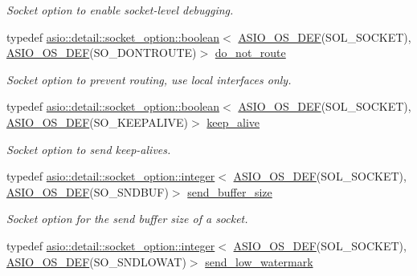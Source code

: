 \begin{DoxyCompactItemize}
\begin{DoxyCompactList}\small\item\em Socket option to enable socket-\/level debugging. \end{DoxyCompactList}\item 
typedef \hyperlink{classasio_1_1detail_1_1socket__option_1_1boolean}{asio\+::detail\+::socket\+\_\+option\+::boolean}$<$ \hyperlink{socket__types_8hpp_a26e0208fa086ac48cf5af1b2a521c74a}{A\+S\+I\+O\+\_\+\+O\+S\+\_\+\+D\+E\+F}(S\+O\+L\+\_\+\+S\+O\+C\+K\+E\+T), \hyperlink{socket__types_8hpp_a26e0208fa086ac48cf5af1b2a521c74a}{A\+S\+I\+O\+\_\+\+O\+S\+\_\+\+D\+E\+F}(S\+O\+\_\+\+D\+O\+N\+T\+R\+O\+U\+T\+E)$>$ \hyperlink{classasio_1_1socket__base_ab7b1853c3ab069c31202a5ea11deb882}{do\+\_\+not\+\_\+route}
\begin{DoxyCompactList}\small\item\em Socket option to prevent routing, use local interfaces only. \end{DoxyCompactList}\item 
typedef \hyperlink{classasio_1_1detail_1_1socket__option_1_1boolean}{asio\+::detail\+::socket\+\_\+option\+::boolean}$<$ \hyperlink{socket__types_8hpp_a26e0208fa086ac48cf5af1b2a521c74a}{A\+S\+I\+O\+\_\+\+O\+S\+\_\+\+D\+E\+F}(S\+O\+L\+\_\+\+S\+O\+C\+K\+E\+T), \hyperlink{socket__types_8hpp_a26e0208fa086ac48cf5af1b2a521c74a}{A\+S\+I\+O\+\_\+\+O\+S\+\_\+\+D\+E\+F}(S\+O\+\_\+\+K\+E\+E\+P\+A\+L\+I\+V\+E)$>$ \hyperlink{classasio_1_1socket__base_a18672db1f78d0e0e58899e90100bf688}{keep\+\_\+alive}
\begin{DoxyCompactList}\small\item\em Socket option to send keep-\/alives. \end{DoxyCompactList}\item 
typedef \hyperlink{classasio_1_1detail_1_1socket__option_1_1integer}{asio\+::detail\+::socket\+\_\+option\+::integer}$<$ \hyperlink{socket__types_8hpp_a26e0208fa086ac48cf5af1b2a521c74a}{A\+S\+I\+O\+\_\+\+O\+S\+\_\+\+D\+E\+F}(S\+O\+L\+\_\+\+S\+O\+C\+K\+E\+T), \hyperlink{socket__types_8hpp_a26e0208fa086ac48cf5af1b2a521c74a}{A\+S\+I\+O\+\_\+\+O\+S\+\_\+\+D\+E\+F}(S\+O\+\_\+\+S\+N\+D\+B\+U\+F)$>$ \hyperlink{classasio_1_1socket__base_a0d4a964ee76ec66ae251e903bff872e5}{send\+\_\+buffer\+\_\+size}
\begin{DoxyCompactList}\small\item\em Socket option for the send buffer size of a socket. \end{DoxyCompactList}\item 
typedef \hyperlink{classasio_1_1detail_1_1socket__option_1_1integer}{asio\+::detail\+::socket\+\_\+option\+::integer}$<$ \hyperlink{socket__types_8hpp_a26e0208fa086ac48cf5af1b2a521c74a}{A\+S\+I\+O\+\_\+\+O\+S\+\_\+\+D\+E\+F}(S\+O\+L\+\_\+\+S\+O\+C\+K\+E\+T), \hyperlink{socket__types_8hpp_a26e0208fa086ac48cf5af1b2a521c74a}{A\+S\+I\+O\+\_\+\+O\+S\+\_\+\+D\+E\+F}(S\+O\+\_\+\+S\+N\+D\+L\+O\+W\+A\+T)$>$ \hyperlink{classasio_1_1socket__base_ac6dce7c293671df85757eeed300d4209}{send\+\_\+low\+\_\+watermark}

\end{DoxyCompactItemize}
